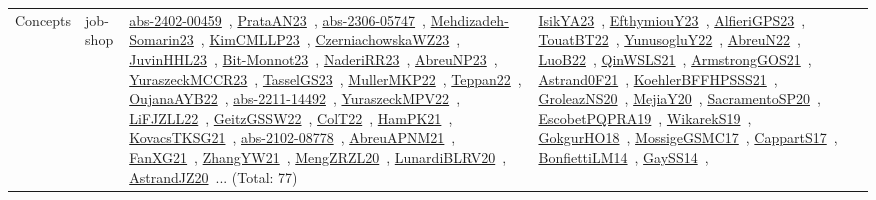 {\begin{longtable}{lp{3cm}>{\raggedright\arraybackslash}p{6cm}>{\raggedright\arraybackslash}p{6cm}>{\raggedright\arraybackslash}p{8cm}}
Concepts & job-shop & \href{works/abs-2402-00459.pdf}{abs-2402-00459}~\cite{abs-2402-00459}, \href{works/PrataAN23.pdf}{PrataAN23}~\cite{PrataAN23}, \href{works/abs-2306-05747.pdf}{abs-2306-05747}~\cite{abs-2306-05747}, \href{works/Mehdizadeh-Somarin23.pdf}{Mehdizadeh-Somarin23}~\cite{Mehdizadeh-Somarin23}, \href{works/KimCMLLP23.pdf}{KimCMLLP23}~\cite{KimCMLLP23}, \href{works/CzerniachowskaWZ23.pdf}{CzerniachowskaWZ23}~\cite{CzerniachowskaWZ23}, \href{works/JuvinHHL23.pdf}{JuvinHHL23}~\cite{JuvinHHL23}, \href{works/Bit-Monnot23.pdf}{Bit-Monnot23}~\cite{Bit-Monnot23}, \href{works/NaderiRR23.pdf}{NaderiRR23}~\cite{NaderiRR23}, \href{works/AbreuNP23.pdf}{AbreuNP23}~\cite{AbreuNP23}, \href{works/YuraszeckMCCR23.pdf}{YuraszeckMCCR23}~\cite{YuraszeckMCCR23}, \href{works/TasselGS23.pdf}{TasselGS23}~\cite{TasselGS23}, \href{works/MullerMKP22.pdf}{MullerMKP22}~\cite{MullerMKP22}, \href{works/Teppan22.pdf}{Teppan22}~\cite{Teppan22}, \href{works/OujanaAYB22.pdf}{OujanaAYB22}~\cite{OujanaAYB22}, \href{works/abs-2211-14492.pdf}{abs-2211-14492}~\cite{abs-2211-14492}, \href{works/YuraszeckMPV22.pdf}{YuraszeckMPV22}~\cite{YuraszeckMPV22}, \href{works/LiFJZLL22.pdf}{LiFJZLL22}~\cite{LiFJZLL22}, \href{works/GeitzGSSW22.pdf}{GeitzGSSW22}~\cite{GeitzGSSW22}, \href{works/ColT22.pdf}{ColT22}~\cite{ColT22}, \href{works/HamPK21.pdf}{HamPK21}~\cite{HamPK21}, \href{works/KovacsTKSG21.pdf}{KovacsTKSG21}~\cite{KovacsTKSG21}, \href{works/abs-2102-08778.pdf}{abs-2102-08778}~\cite{abs-2102-08778}, \href{works/AbreuAPNM21.pdf}{AbreuAPNM21}~\cite{AbreuAPNM21}, \href{works/FanXG21.pdf}{FanXG21}~\cite{FanXG21}, \href{works/ZhangYW21.pdf}{ZhangYW21}~\cite{ZhangYW21}, \href{works/MengZRZL20.pdf}{MengZRZL20}~\cite{MengZRZL20}, \href{works/LunardiBLRV20.pdf}{LunardiBLRV20}~\cite{LunardiBLRV20}, \href{works/AstrandJZ20.pdf}{AstrandJZ20}~\cite{AstrandJZ20}... (Total: 77) & \href{works/IsikYA23.pdf}{IsikYA23}~\cite{IsikYA23}, \href{works/EfthymiouY23.pdf}{EfthymiouY23}~\cite{EfthymiouY23}, \href{works/AlfieriGPS23.pdf}{AlfieriGPS23}~\cite{AlfieriGPS23}, \href{works/TouatBT22.pdf}{TouatBT22}~\cite{TouatBT22}, \href{works/YunusogluY22.pdf}{YunusogluY22}~\cite{YunusogluY22}, \href{works/AbreuN22.pdf}{AbreuN22}~\cite{AbreuN22}, \href{works/LuoB22.pdf}{LuoB22}~\cite{LuoB22}, \href{works/QinWSLS21.pdf}{QinWSLS21}~\cite{QinWSLS21}, \href{works/ArmstrongGOS21.pdf}{ArmstrongGOS21}~\cite{ArmstrongGOS21}, \href{works/Astrand0F21.pdf}{Astrand0F21}~\cite{Astrand0F21}, \href{works/KoehlerBFFHPSSS21.pdf}{KoehlerBFFHPSSS21}~\cite{KoehlerBFFHPSSS21}, \href{works/GroleazNS20.pdf}{GroleazNS20}~\cite{GroleazNS20}, \href{works/MejiaY20.pdf}{MejiaY20}~\cite{MejiaY20}, \href{works/SacramentoSP20.pdf}{SacramentoSP20}~\cite{SacramentoSP20}, \href{works/EscobetPQPRA19.pdf}{EscobetPQPRA19}~\cite{EscobetPQPRA19}, \href{works/WikarekS19.pdf}{WikarekS19}~\cite{WikarekS19}, \href{works/GokgurHO18.pdf}{GokgurHO18}~\cite{GokgurHO18}, \href{works/MossigeGSMC17.pdf}{MossigeGSMC17}~\cite{MossigeGSMC17}, \href{works/CappartS17.pdf}{CappartS17}~\cite{CappartS17}, \href{works/BonfiettiLM14.pdf}{BonfiettiLM14}~\cite{BonfiettiLM14}, \href{works/GaySS14.pdf}{GaySS14}~\cite{GaySS14}, 
\end{longtable}}
